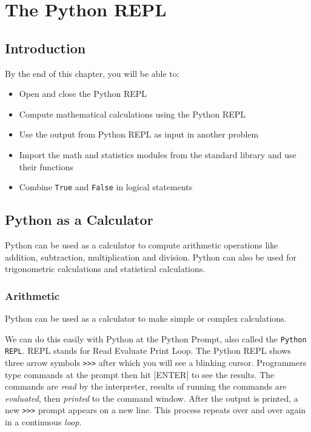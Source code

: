 \documentclass{book}
\begin{document}
    \chapter{The Python REPL}\label{the-python-repl}

    \section{Introduction}\label{introduction}

    By the end of this chapter, you will be able to:

\begin{itemize}
\item
  Open and close the Python REPL
\item
  Compute mathematical calculations using the Python REPL
\item
  Use the output from Python REPL as input in another problem
\item
  Import the math and statistics modules from the standard library and
  use their functions
\item
  Combine \lstinline!True! and \lstinline!False! in logical statements
\end{itemize}

    \section{Python as a Calculator}\label{python-as-a-calculator}

    Python can be used as a calculator to compute arithmetic operations like
addition, subtraction, multiplication and division. Python can also be
used for trigonometric calculations and statistical calculations.

    \subsection{Arithmetic}\label{arithmetic}

Python can be used as a calculator to make simple or complex
calculations.

We can do this easily with Python at the Python Prompt, also called the
\lstinline!Python REPL!. REPL stands for Read Evaluate Print Loop. The
Python REPL shows three arrow symbols \lstinline!>>>! after which you
will see a blinking cursor. Programmers type commands at the prompt then
hit {[}ENTER{]} to see the results. The commands are \emph{read} by the
interpreter, results of running the commands are \emph{evaluated}, then
\emph{printed} to the command window. After the output is printed, a new
\lstinline!>>>! prompt appears on a new line. This process repeats over
and over again in a continuous \emph{loop}.
\end{document}
